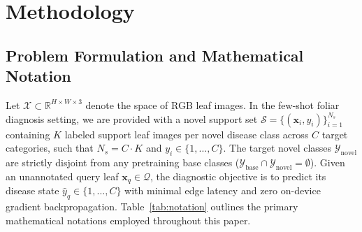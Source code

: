 \documentclass[a4paper,fleqn,nologo]{cas-dc}
\begin{document}
\section{Methodology}
\label{sec:methodology}

\subsection{Problem Formulation and Mathematical Notation}
\label{sec:notation}
Let $\mathcal{X} \subset \mathbb{R}^{H \times W \times 3}$ denote the space of RGB leaf images. In the few-shot foliar diagnosis setting, we are provided with a novel support set $\mathcal{S} = \{(\mathbf{x}_i, y_i)\}_{i=1}^{N_s}$ containing $K$ labeled support leaf images per novel disease class across $C$ target categories, such that $N_s = C \cdot K$ and $y_i \in \{1, \dots, C\}$. The target novel classes $\mathcal{Y}_{\text{novel}}$ are strictly disjoint from any pretraining base classes ($\mathcal{Y}_{\text{base}} \cap \mathcal{Y}_{\text{novel}} = \emptyset$). Given an unannotated query leaf $\mathbf{x}_q \in \mathcal{Q}$, the diagnostic objective is to predict its disease state $\hat{y}_q \in \{1, \dots, C\}$ with minimal edge latency and zero on-device gradient backpropagation. Table~\ref{tab:notation} outlines the primary mathematical notations employed throughout this paper.
\end{document}
